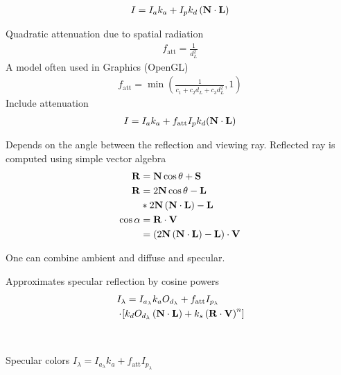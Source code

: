 \begin{compactdesc}
\item[\lp{Sum ambient and  diffuse reflection}]
	\begin{gather*}
		I=I_ak_a+I_pk_d\left( \bm{\mathrm{N}}\cdot\bm{\mathrm{L}} \right)
	\end{gather*}
\item[\lp{Attenuation}] Quadratic attenuation due to spatial radiation
	\begin{gather*}
		f_{\text{att}}=\frac{1}{d_{L}^{2}}
	\end{gather*}
	A model often used in Graphics  (OpenGL)
	\begin{gather*}
		f_{\text{att}}=\min\left( \frac{1}{c_1+c_2d_L+c_3d_L^2},1 \right)
	\end{gather*}
	Include attenuation
	\begin{gather*}
		I=I_ak_a+f_{\text{att}}I_pk_d(\bm{\mathrm{N}}\cdot \bm{\mathrm{L}})
	\end{gather*}
\item[\lp{Specular Reflection}] Depends on the angle between the reflection and viewing ray. Reflected ray is computed using simple vector algebra
	\begin{align*}
		\bm{\mathrm{R}}&=\bm{\mathrm{N}}\cos\theta+\bm{\mathrm{S}}\\
		\bm{\mathrm{R}}&=2\bm{\mathrm{N}}\cos\theta-\bm{\mathrm{L}}\\
		&* 2\bm{\mathrm{N}}\left( \bm{\mathrm{N}}\cdot \bm{\mathrm{L}} \right)-\bm{\mathrm{L}}\\
		\cos\alpha&=\bm{\mathrm{R}}\cdot \bm{\mathrm{V}}\\
		&= \left( 2\bm{\mathrm{N}}\left( \bm{\mathrm{N}}\cdot \bm{\mathrm{L}} \right)-\bm{\mathrm{L}} \right)\cdot \bm{\mathrm{V}}
	\end{align*}
\item[\lp{Ambient + Diffuse + Specular}] One can combine ambient and diffuse and specular.
\item[\lp{Phong illumination model}]
	Approximates specular reflection by cosine powers
	\begin{align*}
		&I_{\lambda}=I_{a_{\lambda}}k_aO_{d_{\lambda}}+f_{\text{att}}I_{p_{\lambda}}\\
		&\cdot
		\!\left[ k_dO_{d_{\lambda}}\left( \bm{\mathrm{N}}\cdot \bm{\mathrm{L}} \right)+k_s\left( \bm{\mathrm{R}}\cdot \bm{\mathrm{V}} \right)^n \right]\!
	\end{align*}
	\item[\lp{Extensions}] \hfill\\
		\begin{enumerate*}[label=\protect\circled{\arabic*},itemjoin=]
			\item Specular colors\hfill
				$I_{\lambda}=I_{a_{\lambda}}k_a+f_{\text{att}}I_{p_{\lambda}}$\\

\end{enumerate*}
\end{compactdesc}
